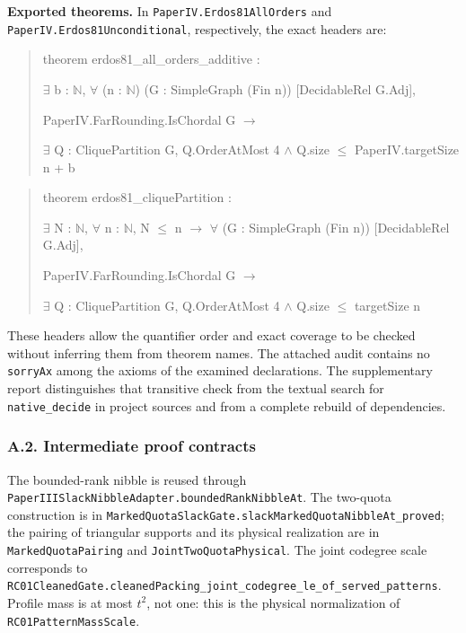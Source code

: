 \documentclass[english,11pt,a4paper]{article}
\begin{document}
\textbf{Exported theorems.} In \nolinkurl{PaperIV.Erdos81AllOrders} and \nolinkurl{PaperIV.Erdos81Unconditional}, respectively, the exact headers are:

\begin{quote}\footnotesize\ttfamily\raggedright
theorem erdos81\_all\_orders\_additive :\par
    \(\exists\) b : \(\mathbb N\), \(\forall\) (n : \(\mathbb N\)) (G : SimpleGraph (Fin n)) [DecidableRel G.Adj],\par
      PaperIV.FarRounding.IsChordal G \(\to\)\par
        \(\exists\) Q : CliquePartition G, Q.OrderAtMost 4 \(\land\) Q.size \(\le\) PaperIV.targetSize n + b\par
\end{quote}

\begin{quote}\footnotesize\ttfamily\raggedright
theorem erdos81\_cliquePartition :\par
    \(\exists\) N : \(\mathbb N\), \(\forall\) n : \(\mathbb N\), N \(\le\) n \(\to\) \(\forall\) (G : SimpleGraph (Fin n)) [DecidableRel G.Adj],\par
      PaperIV.FarRounding.IsChordal G \(\to\)\par
        \(\exists\) Q : CliquePartition G, Q.OrderAtMost 4 \(\land\) Q.size \(\le\) targetSize n\par
\end{quote}

These headers allow the quantifier order and exact coverage to be checked without inferring them from theorem names. The attached audit contains no \nolinkurl{sorryAx} among the axioms of the examined declarations. The supplementary report distinguishes that transitive check from the textual search for \nolinkurl{native_decide} in project sources and from a complete rebuild of dependencies.

\subsubsection{A.2. Intermediate proof contracts}\label{a.2.-intermediate-proof-contracts}

The bounded-rank nibble is reused through \nolinkurl{PaperIIISlackNibbleAdapter.boundedRankNibbleAt}. The two-quota construction is in \nolinkurl{MarkedQuotaSlackGate.slackMarkedQuotaNibbleAt_proved}; the pairing of triangular supports and its physical realization are in \nolinkurl{MarkedQuotaPairing} and \nolinkurl{JointTwoQuotaPhysical}. The joint codegree scale corresponds to \nolinkurl{RC01CleanedGate.cleanedPacking_joint_codegree_le_of_served_patterns}. Profile mass is at most \(t^2\), not one: this is the physical normalization of \nolinkurl{RC01PatternMassScale}.
\end{document}
